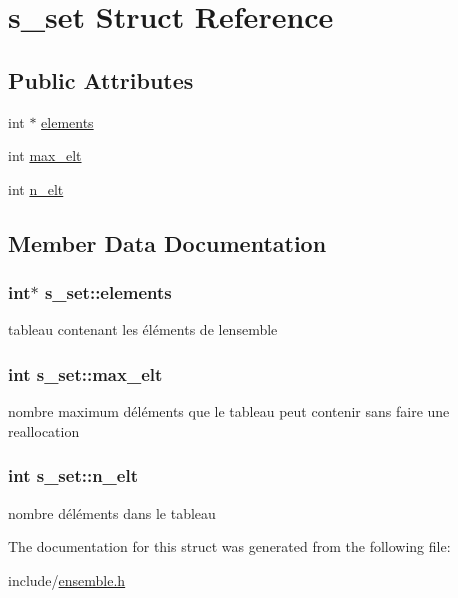\hypertarget{structs__set}{}\section{s\+\_\+set Struct Reference}
\label{structs__set}
\subsection*{Public Attributes}
\begin{DoxyCompactItemize}
\item 
int $\ast$ \hyperlink{structs__set_a11885c553f5034a229f33209eeeb3932}{elements}
\item 
int \hyperlink{structs__set_a85a5c45205e8f8ac61d32d28ecac4e20}{max\+\_\+elt}
\item 
int \hyperlink{structs__set_ac5d24903f7f143cd44e352c622837c64}{n\+\_\+elt}
\end{DoxyCompactItemize}


\subsection{Member Data Documentation}
\subsubsection[{\texorpdfstring{elements}{elements}}]{\setlength{\rightskip}{0pt plus 5cm}int$\ast$ s\+\_\+set\+::elements}\hypertarget{structs__set_a11885c553f5034a229f33209eeeb3932}{}\label{structs__set_a11885c553f5034a229f33209eeeb3932}
tableau contenant les éléments de l\textquotesingle{}ensemble 
\subsubsection[{\texorpdfstring{max\+\_\+elt}{max_elt}}]{\setlength{\rightskip}{0pt plus 5cm}int s\+\_\+set\+::max\+\_\+elt}\hypertarget{structs__set_a85a5c45205e8f8ac61d32d28ecac4e20}{}\label{structs__set_a85a5c45205e8f8ac61d32d28ecac4e20}
nombre maximum d\textquotesingle{}éléments que le tableau peut contenir sans faire une reallocation 
\subsubsection[{\texorpdfstring{n\+\_\+elt}{n_elt}}]{\setlength{\rightskip}{0pt plus 5cm}int s\+\_\+set\+::n\+\_\+elt}\hypertarget{structs__set_ac5d24903f7f143cd44e352c622837c64}{}\label{structs__set_ac5d24903f7f143cd44e352c622837c64}
nombre d\textquotesingle{}éléments dans le tableau 

The documentation for this struct was generated from the following file\+:\begin{DoxyCompactItemize}
\item 
include/\hyperlink{ensemble_8h}{ensemble.\+h}\end{DoxyCompactItemize}
